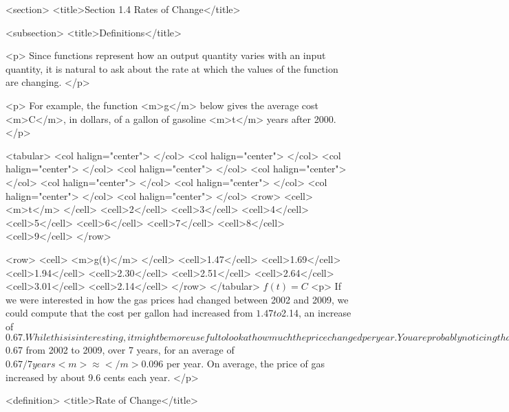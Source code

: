 <section>
    <title>Section 1.4 Rates of Change</title>

    <subsection>
        <title>Definitions</title>

        <p>
            Since functions represent how an output quantity varies with an input quantity, it is natural to ask about the rate at which the values of the function are changing.
        </p>

        <p>
            For example, the function <m>g</m> below gives the average cost <m>C</m>, in dollars, of a gallon of gasoline <m>t</m> years after 2000.
        </p>

        <tabular>
            <col halign="center"> </col> <col halign="center"> </col> <col halign="center"> </col> <col halign="center"> </col> <col halign="center"> </col> <col halign="center"> </col> <col halign="center"> </col> <col halign="center"> </col> <col halign="center"> </col>
            <row>
                <cell> <m>t</m> </cell>
                <cell>2</cell>
                <cell>3</cell>
                <cell>4</cell>
                <cell>5</cell>
                <cell>6</cell>
                <cell>7</cell>
                <cell>8</cell>
                <cell>9</cell>
            </row>

            <row>
                <cell> <m>g(t)</m> </cell>
                <cell>1.47</cell>
                <cell>1.69</cell>
                <cell>1.94</cell>
                <cell>2.30</cell>
                <cell>2.51</cell>
                <cell>2.64</cell>
                <cell>3.01</cell>
                <cell>2.14</cell>
            </row>
        </tabular>
        $f(t)=C$
        <p>
            If we were interested in how the gas prices had changed between 2002 and 2009, we could compute that the cost per gallon had increased from $1.47 to $2.14, an increase of $0.67.
            While this is interesting, it might be more useful to look at how much the price changed per year.
            You are probably noticing that the price didn’t change the same amount each year, so we would be finding the average rate of change over a specified amount of time.
        </p>

        <p>
            The gas price increased by $0.67 from 2002 to 2009, over 7 years, for an average of $0.67/7 years <m>\approx</m> $0.096 per year.
            On average, the price of gas increased by about 9.6 cents each year.
        </p>

        <definition>
            <title>Rate of Change</title>

